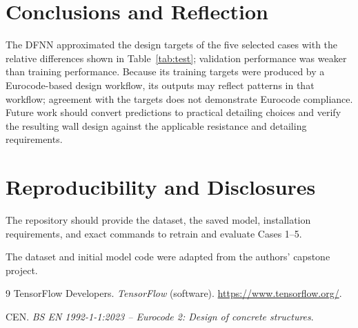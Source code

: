 \documentclass[10pt,a4paper]{article}
\begin{document}
\section{Conclusions and Reflection}
The DFNN approximated the design targets of the five selected cases with the
relative differences shown in Table~\ref{tab:test}; validation performance
was weaker than training performance. Because its training targets
were produced by a Eurocode-based design workflow, its outputs may reflect
patterns in that workflow; agreement with the targets does not demonstrate
Eurocode compliance. Future work should convert predictions to practical
detailing choices and verify the resulting wall design against the applicable
resistance and detailing requirements.

\section*{Reproducibility and Disclosures}
The repository should provide the dataset, the saved model, installation
requirements, and exact commands to retrain and evaluate Cases 1--5.

The dataset and initial model code were adapted from the authors' capstone
project.

\begin{thebibliography}{9}
\setlength{\itemsep}{0pt}
 TensorFlow Developers. \emph{TensorFlow} (software).
\url{https://www.tensorflow.org/}.

 CEN. \emph{BS EN 1992-1-1:2023 -- Eurocode 2: Design of concrete structures}.
\end{thebibliography}
\end{document}
